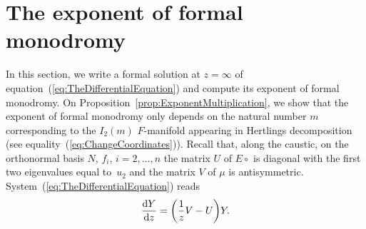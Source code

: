 \documentclass[pdftex]{sigma}
\numberwithin{equation}{section}
\begin{document}
\section{The exponent of formal monodromy}
 \label{sec:ExponentOfFormalMonodromy}
 In this section, we write a formal solution at $z=\infty$ of equation~(\ref{eq:TheDifferentialEquation}) and compute its exponent of formal monodromy. On Proposition~\ref{prop:ExponentMultiplication}, we show that the exponent of formal monodromy only depends on the natural number $m$ corresponding to the $I_{2}(m)$ $F$-manifold appearing in Hertlings decomposition (see equality~(\ref{eq:ChangeCoordinates})). Recall that, along the caustic, on the orthonormal basis $N$, $f_{i}$, $i=2,\dots, n$ the matrix $U$ of $E\circ$ is diagonal with the first two eigenvalues equal to~$u_{2}$ and the matrix $V$ of $\mu$ is antisymmetric. System~(\ref{eq:TheDifferentialEquation}) reads
 \begin{equation*}
 \frac{{\rm d}Y}{{\rm d}z}=\biggl( \frac{1}{z}V-U\biggr)Y.
 \end{equation*}
\end{document}

